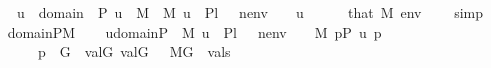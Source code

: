 \begin{isabellebody}
\ \ \ \ \ {\isachardoublequoteopen}u\ {\isasymin}\ domain{\isacharparenleft}{\kern0pt}{\isasympi}{\isacharparenright}{\kern0pt}\ {\isasymtimes}\ P{\isachardoublequoteclose}\ {\isachardoublequoteopen}u\ {\isasymin}\ M{\isachardoublequoteclose}\ \ {\isachardoublequoteopen}M{\isacharcomma}{\kern0pt}\ {\isacharbrackleft}{\kern0pt}u{\isacharbrackright}{\kern0pt}\ {\isacharat}{\kern0pt}\ {\isacharquery}{\kern0pt}Pl{}\ {\isacharat}{\kern0pt}{\isacharbrackleft}{\kern0pt}{\isasympi}{\isacharbrackright}{\kern0pt}\ {\isacharat}{\kern0pt}\ nenv\ {\isasymTurnstile}\ {\isacharquery}{\kern0pt}{\isasympsi}{\isachardoublequoteclose}\ \ u\isanewline
\ \ \ \ \isamarkupfalse%
\ that\ {\isacartoucheopen}{\isasympi}{\isasymin}M{\isacartoucheclose}\ {\isacartoucheopen}env\ {\isasymin}\ {\isacharunderscore}{\kern0pt}{\isacartoucheclose}\ \isamarkupfalse%
\ simp\isanewline
\ \ \isamarkupfalse%
\ {\isacartoucheopen}domain{\isacharparenleft}{\kern0pt}{\isasympi}{\isacharparenright}{\kern0pt}{\isasymtimes}P{\isasymin}M{\isacartoucheclose}\isanewline
\ \ \isamarkupfalse%
\ {\isachardoublequoteopen}{\isasymforall}u{\isasymin}domain{\isacharparenleft}{\kern0pt}{\isasympi}{\isacharparenright}{\kern0pt}{\isasymtimes}P\ {\isachardot}{\kern0pt}\ {\isacharparenleft}{\kern0pt}M{\isacharcomma}{\kern0pt}\ {\isacharbrackleft}{\kern0pt}u{\isacharbrackright}{\kern0pt}\ {\isacharat}{\kern0pt}\ {\isacharquery}{\kern0pt}Pl{}\ {\isacharat}{\kern0pt}{\isacharbrackleft}{\kern0pt}{\isasympi}{\isacharbrackright}{\kern0pt}\ {\isacharat}{\kern0pt}\ nenv\ {\isasymTurnstile}\ {\isacharquery}{\kern0pt}{\isasympsi}{\isacharparenright}{\kern0pt}\ {\isasymlongrightarrow}\ {\isacharparenleft}{\kern0pt}{\isasymexists}{\isasymtheta}{\isasymin}M{\isachardot}{\kern0pt}\ {\isasymexists}p{\isasymin}P{\isachardot}{\kern0pt}\ u\ {\isacharequal}{\kern0pt}{\isasymlangle}{\isasymtheta}{\isacharcomma}{\kern0pt}p{\isasymrangle}\ {\isasymand}\isanewline
\ \ \ \ \ \ \ \ {\isacharparenleft}{\kern0pt}p\ {\isasymin}\ G\ {\isasymlongrightarrow}\ val{\isacharparenleft}{\kern0pt}G{\isacharcomma}{\kern0pt}\ {\isasymtheta}{\isacharparenright}{\kern0pt}{\isasymin}val{\isacharparenleft}{\kern0pt}G{\isacharcomma}{\kern0pt}\ {\isasympi}{\isacharparenright}{\kern0pt}\ {\isasymand}\ M{\isacharbrackleft}{\kern0pt}G{\isacharbrackright}{\kern0pt}{\isacharcomma}{\kern0pt}\ \ {\isacharquery}{\kern0pt}vals{\isacharparenleft}{\kern0pt}{\isasymtheta}{\isacharparenright}{\kern0pt}\ {\isasymTurnstile}\ \ {\isasymphi}{\isacharparenright}{\kern0pt}{\isacharparenright}{\kern0pt}{\isachardoublequoteclose}\isanewline

\end{isabellebody}
